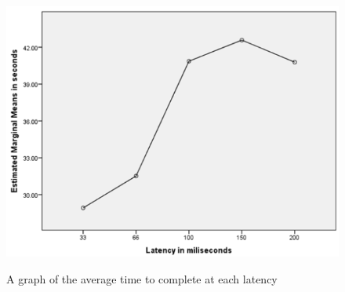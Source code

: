 \begin{figure}[H]
	\centering
	\includegraphics[width=12cm]{../img/fig25.png}
	\caption{A graph of the average time to complete at each latency}
	\parencite[Chapter 4.1, Page 15, Figure 4.1]{claypool2014effects}
\end{figure}